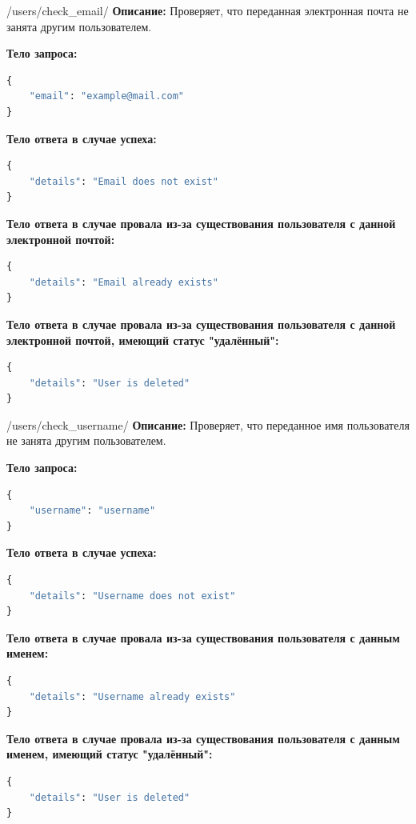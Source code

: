 \documentclass[a4paper,14pt]{extarticle}
\begin{document}
	\begin{postapi}{/users/check\_email/}
		\textbf{Описание:} Проверяет, что переданная электронная почта не занята другим пользователем.\medskip
		
		\textbf{Тело запроса:}
		\begin{lstlisting}[language=Python]
{
    "email": "example@mail.com"
}
		\end{lstlisting}
		
		\textbf{Тело ответа в случае успеха:}
		\begin{lstlisting}[language=Python]
{
    "details": "Email does not exist"
}
		\end{lstlisting}
		
		\textbf{Тело ответа в случае провала из-за существования пользователя с данной электронной почтой:}
		\begin{lstlisting}[language=Python]
{
    "details": "Email already exists"
}
		\end{lstlisting}
		
		\textbf{Тело ответа в случае провала из-за существования пользователя с данной электронной почтой, имеющий статус "удалённый":}
		\begin{lstlisting}[language=Python]
{
    "details": "User is deleted"
}
		\end{lstlisting}
	\end{postapi}
	
	\begin{postapi}{/users/check\_username/}
		\textbf{Описание:} Проверяет, что переданное имя пользователя не занята другим пользователем.\medskip
		
		\textbf{Тело запроса:}
		\begin{lstlisting}[language=Python]
{
    "username": "username"
}
		\end{lstlisting}
		
		\textbf{Тело ответа в случае успеха:}
		\begin{lstlisting}[language=Python]
{
    "details": "Username does not exist"
}
		\end{lstlisting}
		
		\textbf{Тело ответа в случае провала из-за существования пользователя с данным именем:}
		\begin{lstlisting}[language=Python]
{
    "details": "Username already exists"
}
		\end{lstlisting}
		
		\textbf{Тело ответа в случае провала из-за существования пользователя с данным именем, имеющий статус "удалённый":}
		\begin{lstlisting}[language=Python]
{
    "details": "User is deleted"
}
		\end{lstlisting}
	\end{postapi}
	
\end{document}
